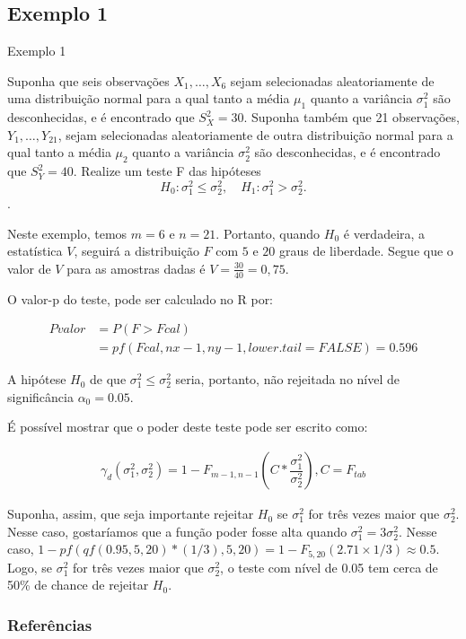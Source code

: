 \documentclass[12pt]{beamer}
\begin{document}
\subsection{Exemplo 1}
\begin{frame}{Exemplo 1}
\begin{block}{}
\justifying
Suponha que seis observações $X_1, \ldots, X_6$ sejam selecionadas aleatoriamente de uma distribuição normal para a qual tanto a média $\mu_1$ quanto a variância $\sigma^2_1$ são desconhecidas, e é encontrado que $S^2_X = 30$. Suponha também que 21 observações, $Y_1, \ldots, Y_{21}$, sejam selecionadas aleatoriamente de outra distribuição normal para a qual tanto a média $\mu_2$ quanto a variância $\sigma^2_2$ são desconhecidas, e é encontrado que $S^2_Y = 40$. Realize um teste F das hipóteses 
\[
H_0: \sigma^2_1 \leq \sigma^2_2, \quad H_1: \sigma^2_1 > \sigma^2_2.
\].

\end{block}
\end{frame}

\begin{frame}{}
\begin{block}{}
\justifying
Neste exemplo, temos $m = 6$ e $n = 21$. Portanto, quando $H_0$ é verdadeira, a estatística $V$, seguirá a distribuição $F$ com $5$ e $20$ graus de liberdade. Segue que o valor de $V$ para as amostras dadas é
$V = \frac{30}{40} = 0,75$.

O valor-p do teste, pode ser calculado no R por:

\begin{align*}
    Pvalor&=P(F>Fcal)\\
    &=pf(Fcal,nx-1,ny-1,lower.tail=FALSE)=0.596
\end{align*}

A hipótese $H_0$ de que $\sigma^2_1 \leq \sigma^2_2$ seria, portanto, não rejeitada no nível de significância $\alpha_0 = 0.05.$ 
\end{block}
\end{frame}

\begin{frame}{}
\begin{block}{}
\justifying
É possível mostrar que o poder deste teste pode ser escrito como:

\begin{align*}
    \gamma_{d}(\sigma_{1}^{2},\sigma_{2}^{2})=1-F_{m-1,n-1}(C*\dfrac{\sigma_{1}^{2}}{\sigma_{2}^{2}}), C=F_{tab}
\end{align*}

Suponha, assim, que seja importante rejeitar $H_0$ se $\sigma^2_1$ for três vezes maior que $\sigma^2_2$. Nesse caso, gostaríamos que a função poder fosse alta quando $\sigma^2_1 = 3\sigma^2_2$. Nesse caso, $1 - pf(qf(0.95,5,20)*(1/3),5,20)=1-F_{5,20}(2.71 \times 1/3) \approx 0.5$. Logo, se $\sigma^2_1$ for três vezes maior que $\sigma^2_2$, o teste com nível de 0.05 tem cerca de 50\% de chance de rejeitar $H_0$.
\end{block}
\end{frame}

\begin{frame}[allowframebreaks]
\frametitle{\bf Referências}
\printbibliography
\end{frame}
\end{document}
